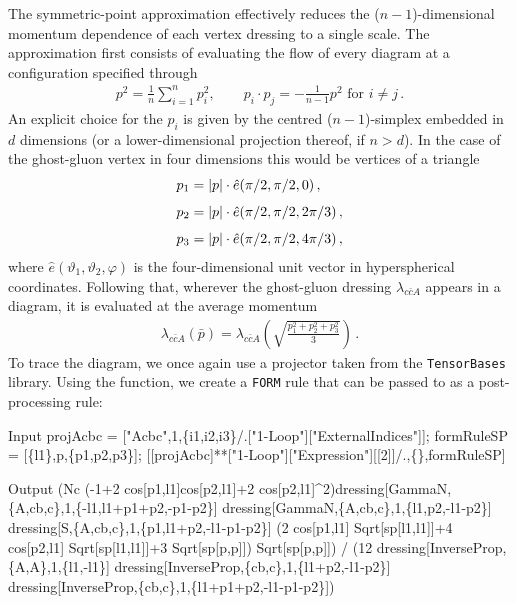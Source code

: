 \documentclass[preprint,10pt,sort&compress]{elsarticle}
\newcommand{\mathem}{\mmaInlineCell{Code}}
\newcommand{\TensorBases}{\texttt{TensorBases}\xspace}
\newcommand{\FORM}{\texttt{FORM}\xspace}
\begin{document}
The symmetric-point approximation effectively reduces the ($n-1$)-dimensional momentum dependence of each vertex dressing to a single scale. The approximation first consists of evaluating the flow of every diagram at a configuration specified through
%
\begin{align}
	p^2 = \frac{1}{n}\sum_{i=1}^n p_i^2,\qquad p_i\cdot p_j = - \frac{1}{n-1} p^2\,\,\textrm{for $i\neq j$}\,. 
	\label{eq:symmetricPoint}
\end{align}
%
An explicit choice for the $p_i$ is given by the centred ($n-1$)-simplex embedded in $d$ dimensions (or a lower-dimensional projection thereof, if $n>d$). 
In the case of the ghost-gluon vertex in four dimensions this would be vertices of a triangle
%
\begin{align}\notag 
	p_1 &= |p|\cdot \hat e (\pi/2, \pi/2, 0)\,,          	\\[1ex] \notag
	p_2 &= |p|\cdot \hat e (\pi/2, \pi/2, 2\pi/3)\,,    \\[1ex]
	p_3 &= |p|\cdot \hat e (\pi/2, \pi/2, 4\pi/3)\,, 
\end{align}
%
where $\hat e(\vartheta_1, \vartheta_2, \varphi)$ is the four-dimensional unit vector in hyperspherical coordinates. Following that, wherever the ghost-gluon dressing $\lambda_{c\bar{c}A}$ appears in a diagram, it is evaluated at the average momentum
%
\begin{align}
	\lambda_{c\bar{c}A}(\bar{p}) = \lambda_{c\bar{c}A}\left(\sqrt{\frac{p_1^2+p_2^2+p_3^2}{3}}\right)\,.
\end{align}
%
To trace the diagram, we once again use a projector taken from the \TensorBases library. Using the \mathem{\mmaDef{FMakeSPFormRule}} function, we create a \FORM rule that can be passed to \mathem{\mmaDef{FormTrace}} as a post-processing rule:
%
\begin{mmaCell}{Input}
projAcbc = ["Acbc",1,\{i1,i2,i3\}/.["1-Loop"]["ExternalIndices"]];
formRuleSP = [\{l1\},p,\{p1,p2,p3\}];
[[projAcbc]**["1-Loop"]["Expression"][[2]]/.,\{\},formRuleSP]
\end{mmaCell}
\begin{mmaCell}{Output}
(Nc (-1+2 cos[p1,l1]cos[p2,l1]+2 cos[p2,l1]^2)dressing[GammaN,\{A,cb,c\},1,\{-l1,l1+p1+p2,-p1-p2\}]
 dressing[GammaN,\{A,cb,c\},1,\{l1,p2,-l1-p2\}] dressing[S,\{A,cb,c\},1,\{p1,l1+p2,-l1-p1-p2\}]
  (2 cos[p1,l1] Sqrt[sp[l1,l1]]+4 cos[p2,l1] Sqrt[sp[l1,l1]]+3 Sqrt[sp[p,p]]) Sqrt[sp[p,p]]) /
 (12 dressing[InverseProp,\{A,A\},1,\{l1,-l1\}] dressing[InverseProp,\{cb,c\},1,\{l1+p2,-l1-p2\}]
  dressing[InverseProp,\{cb,c\},1,\{l1+p1+p2,-l1-p1-p2\}])
\end{mmaCell}
\end{document}
